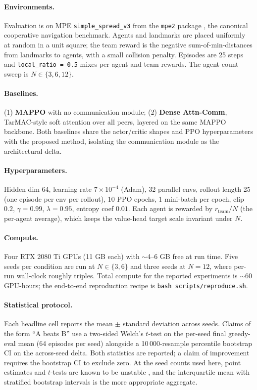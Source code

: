 \label{sec:experiments}
\paragraph{Environments.} Evaluation is on MPE
\texttt{simple\_spread\_v3} from the \texttt{mpe2} package
\citep{terry2020pettingzoo}, the canonical cooperative navigation
benchmark. Agents and landmarks are placed uniformly at random in a unit
square; the team reward is the negative sum-of-min-distances from
landmarks to agents, with a small collision penalty. Episodes are 25
steps and \texttt{local\_ratio = 0.5} mixes per-agent and team rewards.
The agent-count sweep is $N \in \{3, 6, 12\}$.

\paragraph{Baselines.} (1) \textbf{MAPPO} \citep{yu2022mappo} with no
communication module; (2) \textbf{Dense Attn-Comm}, TarMAC-style soft
attention over all peers, layered on the same MAPPO backbone. Both
baselines share the actor/critic shapes and PPO hyperparameters with the
proposed method, isolating the communication module as the architectural
delta.

\paragraph{Hyperparameters.} Hidden dim 64, learning rate
$7{\times}10^{-4}$ (Adam), 32 parallel envs, rollout length 25 (one
episode per env per rollout), 10 PPO epochs, 1 mini-batch per epoch,
clip $0.2$, $\gamma=0.99$, $\lambda=0.95$, entropy coef $0.01$. Each
agent is rewarded by $r_{\text{team}}/N$ (the per-agent average), which
keeps the value-head target scale invariant under $N$.

\paragraph{Compute.} Four RTX 2080 Ti GPUs (11 GB each) with $\sim$4--6
GB free at run time. Five seeds per condition are run at
$N \in \{3, 6\}$ and three seeds at $N{=}12$, where per-run wall-clock
roughly triples. Total compute for the reported experiments is
$\sim 60$ GPU-hours; the end-to-end reproduction recipe is
\texttt{bash scripts/reproduce.sh}.

\paragraph{Statistical protocol.} Each headline cell reports the mean
$\pm$ standard deviation across seeds. Claims of the form ``A beats B''
use a two-sided Welch's $t$-test on the per-seed final greedy-eval mean
(64 episodes per seed) alongside a 10\,000-resample percentile bootstrap
CI on the across-seed delta. Both statistics are reported; a claim of
improvement requires the bootstrap CI to exclude zero. At the seed counts
used here, point estimates and $t$-tests are known to be unstable
\citep{henderson2018matters}, and the interquartile mean with stratified
bootstrap intervals \citep{agarwal2021rliable} is the more appropriate
aggregate.

